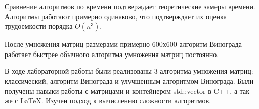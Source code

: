		
			
	
	\newpage
	\flushleft

	Сравнение алгоритмов по времени подтверждает теоретические замеры времени. Алгоритмы работают примерно одинаково, что подтверждает их оценка трудоемкости порядка $O(n^3)$.
	
	После умножения матриц размерами примерно 600х600 алгоритм Винограда работает быстрее обычного алгоритма умножения матриц постоянно.
	
	
	\newpage
	
	
	\flushleft
	В ходе лабораторной работы были реализованы 3 алгоритма умножения матриц: классический, алгоритм Винограда и улучшенным алгоритмом Винограда. Были получены навыки работы с матрицами и контейнером std::vector в C++, а так же с \LaTeX. Изучен подход к вычислению сложности алгоритмов.